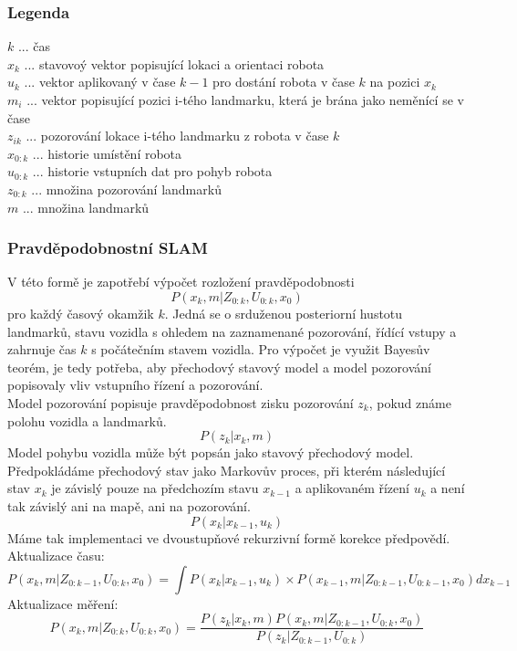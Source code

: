 \documentclass[11pt]{article}
\begin{document}
\subsubsection{Legenda}
$k$ ... čas\\
$x_k$ ... stavovoý vektor popisující lokaci a orientaci robota\\ 
$u_k$ ... vektor aplikovaný v čase $k-1$ pro dostání robota v čase $k$ na pozici $x_k$\\
$m_i$ ... vektor popisující pozici i-tého landmarku, která je brána jako neměnící se v čase\\
$z_{ik}$ ... pozorování lokace i-tého landmarku z robota v čase $k$\\
$x_{0:k}$ ... historie umístění robota\\
$u_{0:k}$ ... historie vstupních dat pro pohyb robota\\
$z_{0:k}$ ... množina pozorování landmarků\\
$m$ ... množina landmarků\\


\subsubsection{Pravděpodobnostní SLAM}
V této formě je zapotřebí výpočet rozložení pravděpodobnosti 
$$P(x_k,m|Z_{0:k},U_{0:k},x_0)$$ 
pro každý časový okamžik ${k}$. Jedná se o srduženou posteriorní hustotu landmarků, stavu vozidla s ohledem na zaznamenané pozorování, řídící vstupy a zahrnuje čas ${k}$ s počátečním stavem vozidla. Pro výpočet je využit Bayesův teorém, je tedy potřeba, aby přechodový stavový model a model pozorování popisovaly vliv vstupního řízení a pozorování.\\
\indent Model pozorování popisuje pravděpodobnost zisku pozorování $z_k$, pokud známe polohu vozidla a landmarků. 
$$P(z_k|x_k,m)$$
\indent Model pohybu vozidla může být popsán jako stavový přechodový model. Předpokládáme přechodový stav jako Markovův proces, při kterém následující stav $x_k$ je závislý pouze na předchozím stavu $x_{k-1}$ a aplikovaném řízení $u_k$ a není tak závislý ani na mapě, ani na pozorování.
$$P(x_k|x_{k-1},u_k)$$
Máme tak implementaci ve dvoustupňové rekurzivní formě korekce předpovědí.\\
Aktualizace času:
$$P(x_k,m|Z_{0:k-1},U_{0:k},x_0)=\int P(x_k|x_{k-1},u_k)\times P(x_{k-1},m|Z_{0:k-1},U_{0:k-1},x_0)dx_{k-1}$$ 
Aktualizace měření:
$$P(x_k,m|Z_{0:k},U_{0:k},x_0)=\frac{P(z_k|x_k,m)P(x_k,m|Z_{0:k-1},U_{0:k},x_0)}{P(z_k|Z_{0:k-1},U_{0:k})}$$
\end{document}
